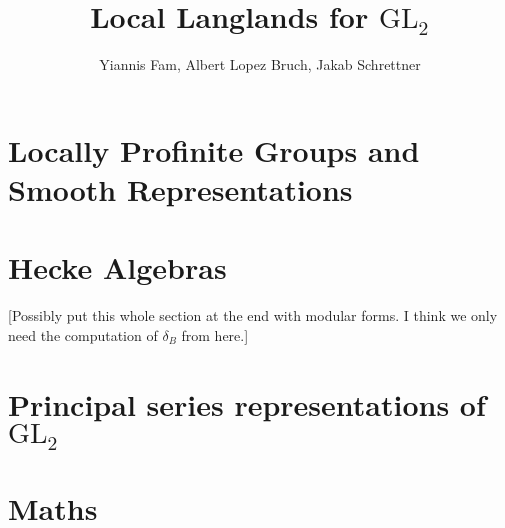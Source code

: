 \documentclass{article}
\title{Local Langlands for $\mathrm{GL}_2$}
\author{Yiannis Fam, Albert Lopez Bruch, Jakab Schrettner}
\newcommand{\GL}{\mathrm{GL}}
\theoremstyle{plain}
\theoremstyle{definition}
\begin{document}
	\maketitle

\section{Locally Profinite Groups and Smooth Representations}



\section{Hecke Algebras}
[Possibly put this whole section at the end with modular forms. I think we only need the computation of $\delta_B$ from here.]




%

\section{Principal series representations of $\GL_2$}


\section{Maths}

\newpage



\end{document}
